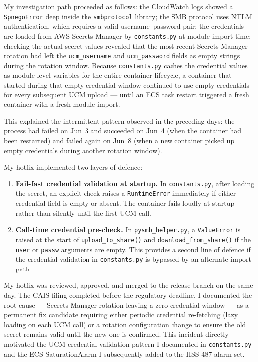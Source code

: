 My investigation path proceeded as follows: the CloudWatch logs showed a
\texttt{SpnegoError} deep inside the \texttt{smbprotocol} library;
the SMB protocol uses NTLM authentication, which requires a valid
username--password pair; the credentials are loaded from AWS Secrets Manager
by \texttt{constants.py} at module import time; checking the actual secret
values revealed that the most recent Secrets Manager rotation had left the
\texttt{ucm\_username} and \texttt{ucm\_password} fields as empty strings
during the rotation window. Because \texttt{constants.py} caches the credential
values as module-level variables for the entire container lifecycle, a container
that started during that empty-credential window continued to use empty
credentials for every subsequent UCM upload --- until an ECS task restart
triggered a fresh container with a fresh module import.

This explained the intermittent pattern observed in the preceding days: the
process had failed on Jun~3 and succeeded on Jun~4 (when the container had
been restarted) and failed again on Jun~8 (when a new container picked up
empty credentials during another rotation window).

My hotfix implemented two layers of defence:

\begin{enumerate}
    \item \textbf{Fail-fast credential validation at startup.} In
          \texttt{constants.py}, after loading the secret, an explicit check
          raises a \texttt{RuntimeError} immediately if either credential field
          is empty or absent. The container fails loudly at startup rather
          than silently until the first UCM call.

    \item \textbf{Call-time credential pre-check.} In \texttt{pysmb\_helper.py},
          a \texttt{ValueError} is raised at the start of
          \texttt{upload\_to\_share()} and \texttt{download\_from\_share()} if
          the \texttt{user} or \texttt{passw} arguments are empty. This provides
          a second line of defence if the credential validation in
          \texttt{constants.py} is bypassed by an alternate import path.
\end{enumerate}

My hotfix was reviewed, approved, and merged to the release branch on the same
day. The CAIS filing completed before the regulatory deadline. I documented the root cause ---
Secrets Manager rotation leaving a zero-credential window --- as
a permanent fix candidate requiring either periodic credential re-fetching
(lazy loading on each UCM call) or a rotation configuration change to ensure
the old secret remains valid until the new one is confirmed. This incident
directly motivated the UCM credential validation pattern I documented in
\texttt{constants.py} and the ECS SaturationAlarm I subsequently added to the
IISS-487 alarm set.

